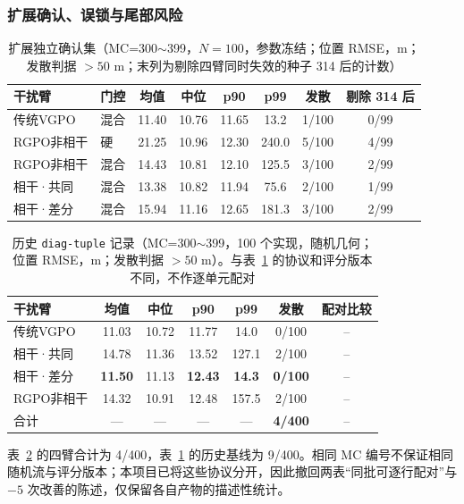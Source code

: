 \documentclass[UTF8,a4paper,zihao=-4]{ctexart}
\begin{document}
\subsubsection{扩展确认、误锁与尾部风险}\label{sec:tail}
\begin{table}[htbp]
\centering
\caption{扩展独立确认集（MC=300$\sim$399，$N=100$，参数冻结；位置 RMSE，m；发散判据 $>50$ m；末列为剔除四臂同时失效的种子 314 后的计数）}\label{tab:mc100}
\small
\begin{tabular}{@{}llcccccc@{}}
\toprule
干扰臂 & 门控 & 均值 & 中位 & p90 & p99 & 发散 & 剔除 314 后\\
\midrule
传统VGPO & 混合 & 11.40 & 10.76 & 11.65 & 13.2 & 1/100 & 0/99\\
RGPO非相干 & 硬 & 21.25 & 10.96 & 12.30 & 240.0 & 5/100 & 4/99\\
RGPO非相干 & 混合 & 14.43 & 10.81 & 12.10 & 125.5 & 3/100 & 2/99\\
相干·共同 & 混合 & 13.38 & 10.82 & 11.94 & 75.6 & 2/100 & 1/99\\
相干·差分 & 混合 & 15.94 & 11.16 & 12.65 & 181.3 & 3/100 & 2/99\\
\bottomrule
\end{tabular}
\end{table}

\begin{table}[htbp]
\centering
\caption{历史 \texttt{diag-tuple} 记录（MC=300$\sim$399，100 个实现，随机几何；位置 RMSE，m；发散判据 $>50$ m）。与表~\ref{tab:mc100} 的协议和评分版本不同，不作逐单元配对}\label{tab:mc100-tuple}
\small
\begin{tabular}{@{}lcccccc@{}}
\toprule
干扰臂 & 均值 & 中位 & p90 & p99 & 发散 & 配对比较\\
\midrule
传统VGPO & 11.03 & 10.72 & 11.77 & 14.0 & 0/100 & -- \\
相干·共同 & 14.78 & 11.36 & 13.52 & 127.1 & 2/100 & -- \\
相干·差分 & \textbf{11.50} & 11.13 & \textbf{12.43} & \textbf{14.3} & \textbf{0/100} & -- \\
RGPO非相干 & 14.32 & 10.91 & 12.48 & 157.5 & 2/100 & -- \\
\midrule
合计 & --- & --- & --- & --- & \textbf{4/400} & -- \\
\bottomrule
\end{tabular}
\end{table}

表~\ref{tab:mc100-tuple} 的四臂合计为 4/400，表~\ref{tab:mc100} 的历史基线为 9/400。相同 MC 编号不保证相同随机流与评分版本；本项目已将这些协议分开，因此撤回两表“同批可逐行配对”与 $-5$ 次改善的陈述，仅保留各自产物的描述性统计。
\end{document}
